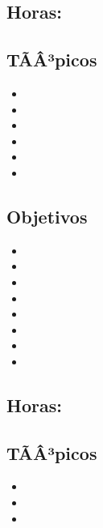 \subsection{\PFCUATRODef}\label{sec:BOK-PF4}
\subsection*{Horas: \PFCUATROHours}

\subsection*{TÃÂ³picos}
\begin{itemize}
	\item \PFCUATROTopicEl
	\item \PFCUATROTopicFunciones
	\item \PFCUATROTopicProcedimientos
	\item \PFCUATROTopicEstrategias
	\item \PFCUATROTopicBacktracking
	\item \PFCUATROTopicImplementacion
\end{itemize}

\subsection*{Objetivos}
\begin{itemize}
	\item \PFCUATROObjUNO
	\item \PFCUATROObjDOS
	\item \PFCUATROObjTRES
	\item \PFCUATROObjCUATRO
	\item \PFCUATROObjCINCO
	\item \PFCUATROObjSEIS
	\item \PFCUATROObjSIETE
	\item \PFCUATROObjOCHO
\end{itemize}

\subsection{\PFCINCODef}\label{sec:BOK-PF5}
\subsection*{Horas: \PFCINCOHours}

\subsection*{TÃÂ³picos}
\begin{itemize}
	\item \PFCINCOTopicMetodos
	\item \PFCINCOTopicPropagacion
	\item \PFCINCOTopicManejo
\end{itemize}

